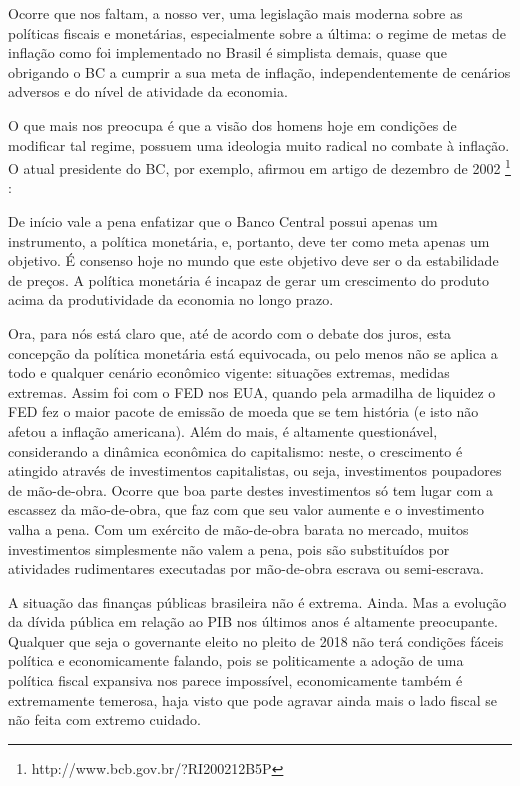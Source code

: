 \documentclass[
	10pt,				%
	openright,			%
	twoside,			%
	a5paper,			%
	english,			%
	french,				%
	spanish,			%
	brazil				%
	]{abntex2}
\renewenvironment{quote}
  {\small\list{}{\rightmargin=0.1cm \leftmargin=4cm}%
   \item\relax}
  {\endlist}
\begin{document}
Ocorre que nos faltam, a nosso ver, uma legislação mais moderna sobre as
políticas fiscais e monetárias, especialmente sobre a última: o regime
de metas de inflação como foi implementado no Brasil é simplista demais,
quase que obrigando o BC a cumprir a sua meta de inflação,
independentemente de cenários adversos e do nível de atividade da
economia.

O que mais nos preocupa é que a visão dos homens hoje em condições de
modificar tal regime, possuem uma ideologia muito radical no combate à
inflação. O atual presidente do BC, por exemplo, afirmou em artigo de
dezembro de 2002 \footnote{http://www.bcb.gov.br/?RI200212B5P} :

\begin{quote}
De início vale a pena enfatizar que o Banco Central possui apenas um
instrumento, a política monetária, e, portanto, deve ter como meta
apenas um objetivo. É consenso hoje no mundo que este objetivo deve ser
o da estabilidade de preços. A política monetária é incapaz de gerar um
crescimento do produto acima da produtividade da economia no longo
prazo.
\end{quote}

Ora, para nós está claro que, até de acordo com o debate dos juros, esta
concepção da política monetária está equivocada, ou pelo menos não se
aplica a todo e qualquer cenário econômico vigente: situações extremas,
medidas extremas. Assim foi com o FED nos EUA, quando pela armadilha de
liquidez o FED fez o maior pacote de emissão de moeda que se tem
história (e isto não afetou a inflação americana). Além do mais, é
altamente questionável, considerando a dinâmica econômica do
capitalismo: neste, o crescimento é atingido através de investimentos
capitalistas, ou seja, investimentos poupadores de mão-de-obra. Ocorre
que boa parte destes investimentos só tem lugar com a escassez da
mão-de-obra, que faz com que seu valor aumente e o investimento valha a
pena. Com um exército de mão-de-obra barata no mercado, muitos
investimentos simplesmente não valem a pena, pois são substituídos por
atividades rudimentares executadas por mão-de-obra escrava ou
semi-escrava.

A situação das finanças públicas brasileira não é extrema. Ainda. Mas a
evolução da dívida pública em relação ao PIB nos últimos anos é
altamente preocupante. Qualquer que seja o governante eleito no pleito
de 2018 não terá condições fáceis política e economicamente falando,
pois se politicamente a adoção de uma política fiscal expansiva nos
parece impossível, economicamente também é extremamente temerosa, haja
visto que pode agravar ainda mais o lado fiscal se não feita com extremo
cuidado.
\end{document}
